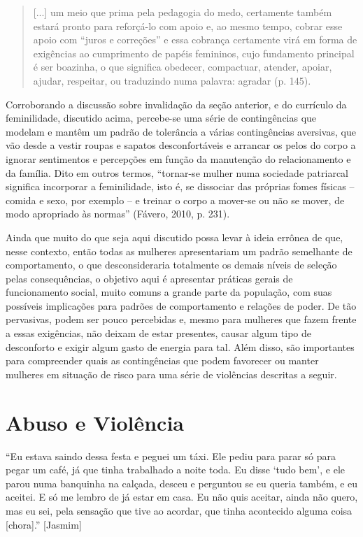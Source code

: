 \begin{quote}
    [...] um meio que prima pela pedagogia do medo, certamente também estará pronto para reforçá-lo com apoio e, ao mesmo tempo, cobrar esse apoio com ``juros e correções'' e essa cobrança certamente virá em forma de exigências ao cumprimento de papéis femininos, cujo fundamento principal é ser boazinha, o que significa obedecer, compactuar, atender, apoiar, ajudar, respeitar, ou traduzindo numa palavra: agradar (p. 145). 
\end{quote}

Corroborando a discussão sobre invalidação da seção anterior, e do currículo da feminilidade, discutido acima, percebe-se uma série de contingências que modelam e mantêm um padrão de tolerância a várias contingências aversivas, que vão desde a vestir roupas e sapatos desconfortáveis e arrancar os pelos do corpo a ignorar sentimentos e percepções em função da manutenção do relacionamento e da família. Dito em outros termos, ``tornar-se mulher numa sociedade patriarcal significa incorporar a feminilidade, isto é, se dissociar das próprias fomes físicas – comida e sexo, por exemplo – e treinar o corpo a mover-se ou não se mover, de modo apropriado às normas'' (Fávero, 2010, p. 231). 

Ainda que muito do que seja aqui discutido possa levar à ideia errônea de que, nesse contexto, então todas as mulheres apresentariam um padrão semelhante de comportamento, o que desconsideraria totalmente os demais níveis de seleção pelas consequências, o objetivo aqui é apresentar práticas gerais de funcionamento social, muito comuns a grande parte da população, com suas possíveis implicações para padrões de comportamento e relações de poder. De tão pervasivas, podem ser pouco percebidas e, mesmo para mulheres que fazem frente a essas exigências, não deixam de estar presentes, causar algum tipo de desconforto e exigir algum gasto de energia para tal. Além disso, são importantes para compreender quais as contingências que podem favorecer ou manter mulheres em situação de risco para uma série de violências descritas a seguir.

\section{Abuso e Violência}

``Eu estava saindo dessa festa e peguei um táxi. Ele pediu para parar só para pegar um café, já que tinha trabalhado a noite toda. Eu disse ‘tudo bem’, e ele parou numa banquinha na calçada, desceu e perguntou se eu queria também, e eu aceitei. E só me lembro de já estar em casa. Eu não quis aceitar, ainda não quero, mas eu sei, pela sensação que tive ao acordar, que tinha acontecido alguma coisa [chora].'' [Jasmim] 

